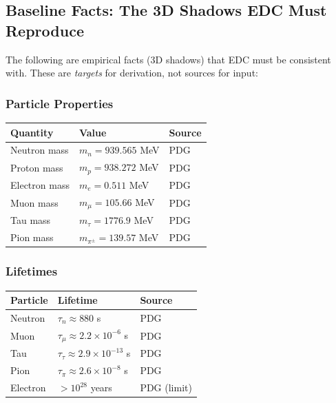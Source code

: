 \subsection{Baseline Facts: The 3D Shadows EDC Must Reproduce}

The following are empirical facts (3D shadows) that EDC must be consistent with.
These are \emph{targets} for derivation, not sources for input:

\subsubsection{Particle Properties}

\begin{center}
\begin{tabular}{lll}
\toprule
\textbf{Quantity} & \textbf{Value} & \textbf{Source} \\
\midrule
Neutron mass & $m_n = 939.565$ MeV & PDG \\
Proton mass & $m_p = 938.272$ MeV & PDG \\
Electron mass & $m_e = 0.511$ MeV & PDG \\
Muon mass & $m_\mu = 105.66$ MeV & PDG \\
Tau mass & $m_\tau = 1776.9$ MeV & PDG \\
Pion mass & $m_{\pi^\pm} = 139.57$ MeV & PDG \\
\bottomrule
\end{tabular}
\end{center}

\subsubsection{Lifetimes}

\begin{center}
\begin{tabular}{lll}
\toprule
\textbf{Particle} & \textbf{Lifetime} & \textbf{Source} \\
\midrule
Neutron & $\tau_n \approx 880$ s & PDG \\
Muon & $\tau_\mu \approx 2.2 \times 10^{-6}$ s & PDG \\
Tau & $\tau_\tau \approx 2.9 \times 10^{-13}$ s & PDG \\
Pion & $\tau_\pi \approx 2.6 \times 10^{-8}$ s & PDG \\
Electron & $> 10^{28}$ years & PDG (limit) \\
\bottomrule
\end{tabular}
\end{center}

